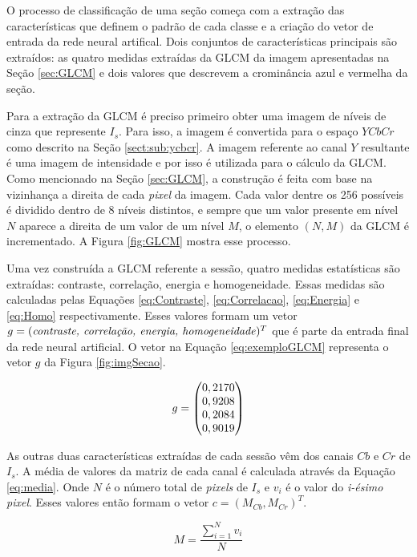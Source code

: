 O processo de classificação de uma seção começa com a extração das características que definem o padrão de cada classe e a criação do vetor de entrada da rede neural artifical. Dois conjuntos de características principais são extraídos: as quatro medidas extraídas da GLCM da imagem apresentadas na Seção \ref{sec:GLCM} e dois valores que descrevem a crominância azul e vermelha da seção.

Para a extração da GLCM é preciso primeiro obter uma imagem de níveis de cinza que represente $I_s$. Para isso, a imagem é convertida para o espaço $YCbCr$ como descrito na Seção \ref{sect:sub:ycbcr}. A imagem referente ao canal $Y$ resultante é uma imagem de intensidade e por isso é utilizada para o cálculo da GLCM. Como mencionado na Seção \ref{sec:GLCM}, a construção é feita com base na vizinhança a direita de cada \textit{pixel} da imagem. Cada valor dentre os 256 possíveis é dividido dentro de 8 níveis distintos, e sempre que um valor presente em nível $N$ aparece a direita de um valor de um nível $M$, o elemento $(N,M)$ da GLCM é incrementado. A Figura \ref{fig:GLCM} mostra esse processo.

Uma vez construída a GLCM referente a sessão, quatro medidas estatísticas são extraídas: contraste, correlação, energia e homogeneidade. Essas medidas são calculadas pelas Equações \ref{eq:Contraste}, \ref{eq:Correlacao}, \ref{eq:Energia} e \ref{eq:Homo} respectivamente. Esses valores formam um vetor $g = (\text{\textit{contraste, correlação, energia, homogeneidade}})^T$ que é parte da entrada final da rede neural artificial. O vetor na Equação \ref{eq:exemploGLCM} representa o vetor $g$ da Figura \ref{fig:imgSecao}.

\begin{equation}
\centering
	g = \begin{pmatrix}
	0,2170\\0,9208\\0,2084\\0,9019
	\end{pmatrix}
\centering
\label{eq:exemploGLCM}
\end{equation}

As outras duas características extraídas de cada sessão vêm dos canais $Cb$ e $Cr$ de $I_s$. A média de valores da matriz de cada canal é calculada através da Equação \ref{eq:media}. Onde $N$ é o número total de \textit{pixels} de $I_s$ e $v_i$ é o valor do \textit{i-ésimo pixel}. Esses valores então formam o vetor $c = (M_{Cb}, M_{Cr})^T$.

\begin{equation}
	M = \frac{\sum_{i=1}^N v_i}{N}
\label{eq:media}
\end{equation}


